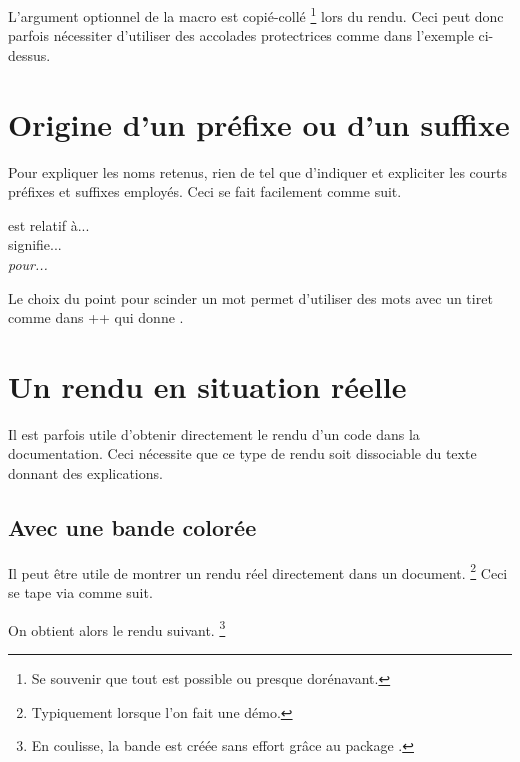 \begin{tdocwarn}
    L'argument optionnel de la macro  est copié-collé
    \footnote{
        Se souvenir que tout est possible ou presque dorénavant.
    }
    lors du rendu. Ceci peut donc parfois nécessiter d'utiliser des accolades protectrices comme dans l'exemple ci-dessus.
\end{tdocwarn}



\section{Origine d'un préfixe ou d'un suffixe}

Pour expliquer les noms retenus, rien de tel que d'indiquer et expliciter les courts préfixes et suffixes employés. Ceci se fait facilement comme suit.


\begin{tdoclatex}[sbs]
 est relatif à...    \\
 signifie... \\
\emph{ pour...}
\end{tdoclatex}


\begin{tdocrem}
    Le choix du point pour scinder un mot permet d'utiliser des mots avec un tiret comme dans \tdocinlatex++ qui donne .
\end{tdocrem}


\section{Un rendu en situation réelle}
\label{tutodoc-showcase}

Il est parfois utile d'obtenir directement le rendu d'un code dans la documentation. Ceci nécessite que ce type de rendu soit dissociable du texte donnant des explications.



\subsection{Avec une bande colorée}

\begin{tdocexa}
    Il peut être utile de montrer un rendu réel directement dans un document.
    \footnote{
        Typiquement lorsque l'on fait une démo.
    }
    Ceci se tape via  comme suit.



    On obtient alors le rendu suivant.
    \footnote{
        En coulisse, la bande est créée sans effort grâce au package .
    }

    \medskip

    

\end{tdocexa}



